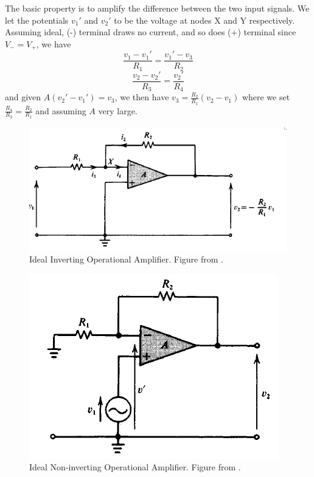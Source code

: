 \documentclass[a4paper]{article}
\begin{document}
\begin{eg}
The basic property is to amplify the difference between the two input signals. We let the potentials $v_1'$ and $v_2'$ to be the voltage at nodes X and Y respectively. Assuming ideal, (-) terminal draws no current, and so does (+) terminal since $V_-=V_+$, we have
$$\frac{v_1-v_1'}{R_1}=\frac{v_1'-v_3}{R_2}$$
$$\frac{v_2-v_2'}{R_3}=\frac{v_2'}{R_4}$$
and given $A(v_2'-v_1')=v_3$, we then have $v_3=\frac{R_2}{R_1}(v_2-v_1)$ where we set $\frac{R_4}{R_3}=\frac{R_2}{R_1}$ and assuming $A$ very large.
\end{eg}
\begin{figure}[H]
    \centering
    \includegraphics[scale=0.65]{invertingideal.PNG}
    \caption{Ideal Inverting Operational Amplifier. Figure from \cite{ahmed_spreadbury_1984}.}
    \label{invertingideal}
\end{figure}
\begin{figure}[H]
    \centering
    \includegraphics[scale=0.65]{non-invertingideal.PNG}
    \caption{Ideal Non-inverting Operational Amplifier. Figure from \cite{ahmed_spreadbury_1984}.}
\end{figure}
\end{document}
